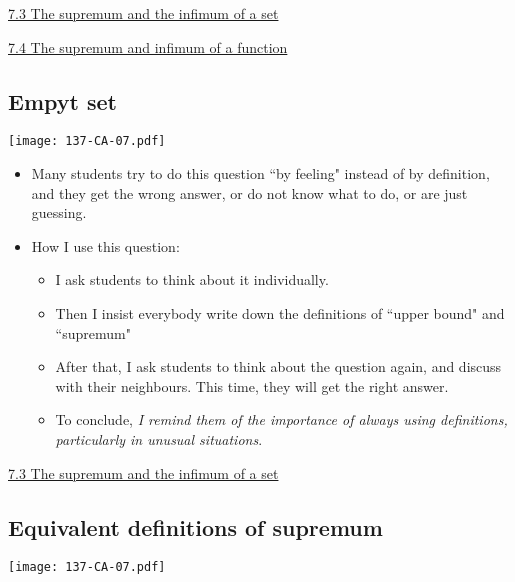 \documentclass[11pt]{article}
\newcommand{\nl}{\hfill \vspace{-1.1\baselineskip}} %
\newcommand{\viii}{\hspace{8mm} \href{https://www.youtube.com/watch?v=4qNstDwlh9I&list=PLlwePzQY_wW9vqCkUudCmoOvnNmr9vMuJ&index=3}{7.3 The supremum and the infimum of a set}}
\newcommand{\viv}{\hspace{8mm} \href{https://www.youtube.com/watch?v=YgXv698pN8g&list=PLlwePzQY_wW9vqCkUudCmoOvnNmr9vMuJ&index=4}{7.4 The supremum and infimum of a function}}
\begin{document}
\begin{videos}
\viii

\viv
\end{videos}

\newpage
\subsection{Empyt set}

\begin{center}
{ \texttt{[image: 137-CA-07.pdf]}} 
\end{center}

\begin{comments}
\nl
	\begin{itemize}
		\item Many students try to do this question ``by feeling" instead of by definition, and they get the wrong answer, or do not know what to do, or are just guessing.
		\item How I use this question:	
			\begin{itemize}
				\item  I ask students to think about it individually.
				\item  Then I insist everybody write down the definitions of ``upper bound" and ``supremum"
				\item  After that, I ask students to think about the question again, and discuss with their neighbours.  This time, they will get the right answer.
				\item  To conclude, \textit{I remind them of the importance of always using definitions, particularly in unusual situations}.
			\end{itemize}
	\end{itemize}
\end{comments}

\begin{videos}
\viii
\end{videos}

\newpage
\subsection{Equivalent definitions of supremum}  \label{a:defsup}

\begin{center}
{ \texttt{[image: 137-CA-07.pdf]}} 
\end{center}
\end{document}
